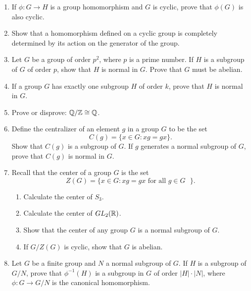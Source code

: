 {\begin{enumerate}
 
\bf\item\rm
If $\phi : G \rightarrow H$ is a group homomorphism and $G$ is cyclic,
prove that $\phi(G)$ is also cyclic. 
 
 
\bf\item\rm
Show that a homomorphism defined on a cyclic group is completely
determined by its action on the generator of the group.


 
 
\bf\item\rm
Let $G$ be a group of order $p^2$, where $p$ is a prime number. If $H$
is a subgroup of $G$ of order $p$, show that $H$ is normal in $G$.
Prove that $G$ must be abelian. 
 
 
\bf\item\rm
If a group $G$ has exactly one subgroup $H$ of order $k$, prove that
$H$ is normal in $G$. 
 
 
\bf\item\rm
Prove or disprove: ${\Bbb Q} / {\Bbb Z} \cong {\Bbb Q}$.
 
 
\bf\item\rm
Define the {\bfi centralizer\/} of an element $g$ in a group $G$
to be the set  
$$
C(g) = \{ x \in G : xg = gx \}.
$$
Show that $C(g)$ is a subgroup of $G$.  If $g$ generates a normal
subgroup of $G$, prove that $C(g)$ is normal in $G$.
 
 
\bf\item\rm
Recall that the {\bfi center\/} of a group $G$ is
the set 
$$
Z(G) = \{ x \in G : xg = gx \mbox{ for all $g \in G$ } \}.
$$
\begin{enumerate}
 
 \bf\item\rm
Calculate the center of $S_3$.
 
 \bf\item\rm
Calculate the center of $GL_2 ( {\Bbb R} )$.
 
 \bf\item\rm
Show that the center of any group $G$ is a normal subgroup of $G$. 
 
 \bf\item\rm
If $G / Z(G)$ is cyclic, show that $G$ is abelian.
 
\end{enumerate}
 
 
\bf\item\rm
Let $G$ be a finite group and $N$ a normal subgroup of $G$. If $H$ is
a subgroup of $G/N$, prove that $\phi^{-1}(H)$ is a subgroup in $G$ of
order $|H| \cdot |N|$, where $\phi : G \rightarrow G/N$ is the
canonical homomorphism. 
 

\end{enumerate}}
